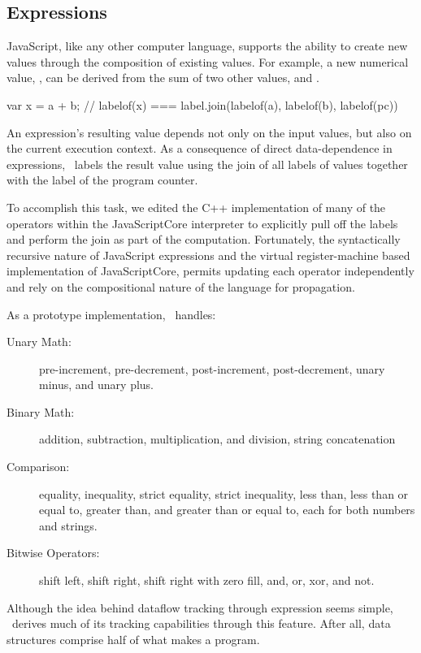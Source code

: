 \subsection{Expressions}

JavaScript, like any other computer language, supports the ability to create new values through the composition of existing values.
For example, a new numerical value, , can be derived from the sum of two other values,  and .

\begin{jscode}
var x = a + b;
// labelof(x) === label.join(labelof(a), labelof(b), labelof(pc))
\end{jscode}

An expression's resulting value depends not only on the input values, but also on the current execution context.
As a consequence of direct data-dependence in expressions, \FlowCore\ labels the result value using the join of all labels of values together with the label of the program counter.

To accomplish this task, we edited the C++ implementation of many of the operators within the JavaScriptCore interpreter to explicitly pull off the labels and perform the join as part of the computation.
Fortunately, the syntactically recursive nature of JavaScript expressions and the virtual register-machine based implementation of JavaScriptCore, permits updating each operator independently and rely on the compositional nature of the language for propagation.

As a prototype implementation, \FlowCore\ handles:
\begin{description}
  \item[Unary Math:] pre-increment, pre-decrement, post-increment, post-decrement, unary minus, and unary plus.
  \item[Binary Math:] addition, subtraction, multiplication, and division, string concatenation
  \item[Comparison:] equality, inequality, strict equality, strict inequality, less than, less than or equal to, greater than, and greater than or equal to, each for both numbers and strings.
  \item[Bitwise Operators:] shift left, shift right, shift right with zero fill, and, or, xor, and not.
\end{description}

Although the idea behind dataflow tracking through expression seems simple, \FlowCore\ derives much of its tracking capabilities through this feature.
After all, data structures comprise half of what makes a program\cite{wirth+76}.

